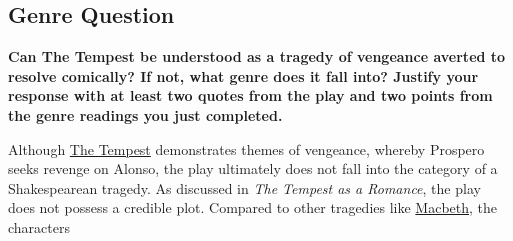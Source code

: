 	\subsection{Genre Question}
		\textbf{Can The Tempest be understood as a tragedy of vengeance averted to resolve comically? If not, what genre does it fall into? Justify your response with at least two quotes from the play and two points from the genre readings you just completed.}

		Although \underline{The Tempest} demonstrates themes of vengeance, whereby Prospero seeks revenge on Alonso, the play ultimately does not fall into the category of a Shakespearean tragedy. As discussed in \textit{The Tempest as a Romance}, the play does not possess a credible plot. Compared to other tragedies like \underline{Macbeth}, the characters 
